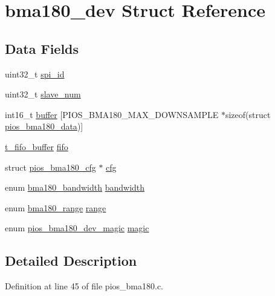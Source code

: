 \hypertarget{structbma180__dev}{\section{bma180\-\_\-dev \-Struct \-Reference}
\label{structbma180__dev}
}
\subsection*{\-Data \-Fields}
\begin{DoxyCompactItemize}
\item 
uint32\-\_\-t \hyperlink{structbma180__dev_aa0e8c93b86245e1fd072692c70d8df2d}{spi\-\_\-id}
\item 
uint32\-\_\-t \hyperlink{structbma180__dev_a9743ebc53aa6398ca08d7b796228b47c}{slave\-\_\-num}
\item 
int16\-\_\-t \hyperlink{structbma180__dev_ab15069f2ae1a91840b59b781df64d014}{buffer} \mbox{[}\-P\-I\-O\-S\-\_\-\-B\-M\-A180\-\_\-\-M\-A\-X\-\_\-\-D\-O\-W\-N\-S\-A\-M\-P\-L\-E $\ast$sizeof(struct \hyperlink{structpios__bma180__data}{pios\-\_\-bma180\-\_\-data})\mbox{]}
\item 
\hyperlink{structt__fifo__buffer}{t\-\_\-fifo\-\_\-buffer} \hyperlink{structbma180__dev_a5ea7560cd48ca5ad1fc285a2ff3084c8}{fifo}
\item 
struct \hyperlink{structpios__bma180__cfg}{pios\-\_\-bma180\-\_\-cfg} $\ast$ \hyperlink{structbma180__dev_ad7ed883d14d9f455e17d12157471501d}{cfg}
\item 
enum \hyperlink{group___p_i_o_s___b_m_a180_gacd6d3ecff286f705778973637b4d3d99}{bma180\-\_\-bandwidth} \hyperlink{structbma180__dev_ac532f2e8a6bae6b073f5491851d59293}{bandwidth}
\item 
enum \hyperlink{group___p_i_o_s___b_m_a180_ga319b0b37d7184097d2ae4e7ba527a416}{bma180\-\_\-range} \hyperlink{structbma180__dev_a85103d7472326b03f89d2b658d56aecc}{range}
\item 
enum \hyperlink{group___p_i_o_s___b_m_a180_ga019b2d5aa99a1a8e1b760c201899fa64}{pios\-\_\-bma180\-\_\-dev\-\_\-magic} \hyperlink{structbma180__dev_ad45772028b3de22401b0bcf218c289e9}{magic}
\end{DoxyCompactItemize}


\subsection{\-Detailed \-Description}


\-Definition at line 45 of file pios\-\_\-bma180.\-c.



